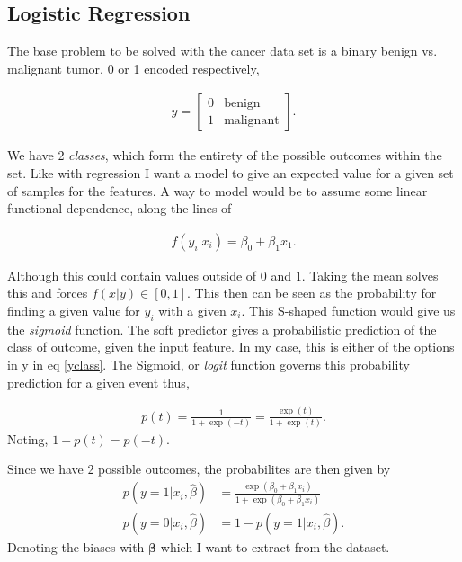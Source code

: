 \documentclass[10pt]{article}
\begin{document}

\subsection{Logistic Regression}
The base problem to be solved with the cancer data set is a binary benign vs.
malignant tumor, 0 or 1 encoded respectively, 

\begin{align}
y = 
	\begin{bmatrix}
		0 & \text{benign} \\
		1 & \text{malignant}
	\end{bmatrix}.
	\label{yclass}
\end{align}

We have 2 \emph{classes}, which form the entirety of the possible outcomes within
the set. Like with regression I want a model to give an expected value for a given 
set of samples for the features. A way to model would be to assume some linear functional
dependence, along the lines of

\begin{align*}
	f(y_i|x_i) = \beta_0 + \beta_1 x_1.
\end{align*}

Although this could contain values outside of 0 and 1. Taking the mean solves
this and forces $f(x|y) \in [0, 1]$. This then can be seen as the probability
for finding a given value for $y_i$ with a given $x_i$. This S-shaped function
would give us the \emph{sigmoid} function. 	
The soft predictor gives a probabilistic prediction of the class of outcome,
given the input feature. In my case, this is either of the options in
y in eq \ref{yclass}.  The Sigmoid, or \emph{logit} function governs this
probability prediction for a given event thus,

\begin{align}
	p(t) = \frac{1}{1 + \exp(-t)} = \frac{\exp(t)}{1+\exp(t)}
	\label{logit}.
\end{align}
Noting, $1 - p(t) = p(-t)$.

Since we have 2 possible outcomes, the probabilites are then given by
\begin{align}
	p(y=1|x_i, \hat{\beta}) &= \frac{ \exp(\beta_0 + \beta_1x_i) }
								{ 1 + \exp(\beta_0 + \beta_1x_i) } 
								\label{prob1}\\
	p(y=0|x_i, \hat{\beta}) &= 1 - p(y=1|x_i, \hat{\beta})\label{prob0}.
\end{align}
Denoting the biases with $\mathbf{\beta}$ which I want to extract from the dataset. 
\end{document}
